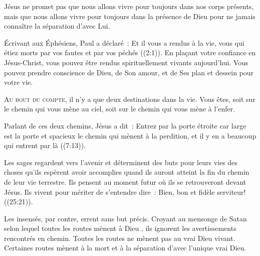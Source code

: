 Jésus ne promet pas que nous allons vivre pour toujours
 dans nos corps présents, mais que nous allons vivre pour toujours
 dans la présence de Dieu
 \ocadr pour ne jamais connaître la séparation d'avec Lui. 

Écrivant aux Éphésiens, Paul a déclaré~:
 \og Et il vous a rendus à la vie, vous qui étiez morts par vos fautes
 et par vos péchés \fg{} ((2:1)).
 En plaçant votre confiance en Jésus-Christ, vous pouvez être rendus
 spirituellement vivants aujourd'hui.
 Vous pouvez prendre conscience de Dieu, de Son amour, et de Ses plan
 et dessein pour votre vie. 

\dvrule







\lettrine{A}{u bout du compte,} il n'y a que deux destinations dans la vie.
 Vous êtes, soit sur le chemin qui vous mène au ciel,
 soit sur le chemin qui vous mène à l'enfer.

Parlant de ces deux chemins, Jésus a dit~: 
 \og Entrez par la porte étroite car large est la porte et spacieux le chemin
 qui mènent à la perdition,
 et il y en a beaucoup qui entrent par là \fg{}
 ((7:13)).


Les sages regardent vers l'avenir et déterminent des buts pour leurs vies
 \ocadr des choses qu'ils espèrent avoir accomplies quand ils auront atteint
 la fin du chemin de leur vie terrestre.
 Ils pensent au moment futur où ils se retrouveront devant Jésus.
 Ils vivent pour mériter de s'entendre dire~: 
 \og Bien, bon et fidèle serviteur! \fg{} ((25:21)).

Les insensés, par contre, errent sans but précis.
 Croyant au mensonge de Satan selon lequel
 \og toutes les routes mènent à Dieu \fg{},
 ils ignorent les avertissements rencontrés en chemin.
 Toutes les routes ne mènent pas au vrai Dieu vivant.
 Certaines routes mènent à la mort
 \ocadr et à la séparation d'avec l'unique vrai Dieu.

